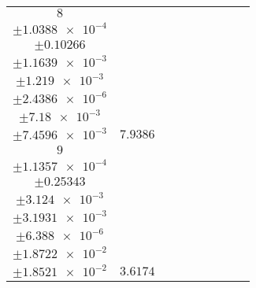 \documentclass[8pt]{article}
\begin{document}
\begin{longtable}[l]{c c c c c c c c c}
$\num{8}$ & \begin{tabular}[c]{@{}c@{}}$\num{5.8812e-2}$ \\ $\pm\num{1.0388e-4}$\end{tabular} & \begin{tabular}[c]{@{}c@{}}$\num{1.8315}$ \\ $\pm\num{0.10266}$\end{tabular} & \begin{tabular}[c]{@{}c@{}}$\num{-7.0294}$ \\ $\pm\num{1.1639e-3}$\end{tabular} & \begin{tabular}[c]{@{}c@{}}$\num{1.4313e+3}$ \\ $\pm\num{1.219e-3}$\end{tabular} & \begin{tabular}[c]{@{}c@{}}$\num{2.8633}$ \\ $\pm\num{2.4386e-6}$\end{tabular} & \begin{tabular}[c]{@{}c@{}}$\num{3.4775}$ \\ $\pm\num{7.18e-3}$\end{tabular} & \begin{tabular}[c]{@{}c@{}}$\num{3.6125}$ \\ $\pm\num{7.4596e-3}$\end{tabular} & $\num{7.9386}$\\
$\num{9}$ & \begin{tabular}[c]{@{}c@{}}$\num{2.7485e-2}$ \\ $\pm\num{1.1357e-4}$\end{tabular} & \begin{tabular}[c]{@{}c@{}}$\num{0.62215}$ \\ $\pm\num{0.25343}$\end{tabular} & \begin{tabular}[c]{@{}c@{}}$\num{-1.9772}$ \\ $\pm\num{3.124e-3}$\end{tabular} & \begin{tabular}[c]{@{}c@{}}$\num{1.4364e+3}$ \\ $\pm\num{3.1931e-3}$\end{tabular} & \begin{tabular}[c]{@{}c@{}}$\num{2.8735}$ \\ $\pm\num{6.388e-6}$\end{tabular} & \begin{tabular}[c]{@{}c@{}}$\num{3.8931}$ \\ $\pm\num{1.8722e-2}$\end{tabular} & \begin{tabular}[c]{@{}c@{}}$\num{3.9135}$ \\ $\pm\num{1.8521e-2}$\end{tabular} & $\num{3.6174}$\\

\end{longtable}
\end{document}
